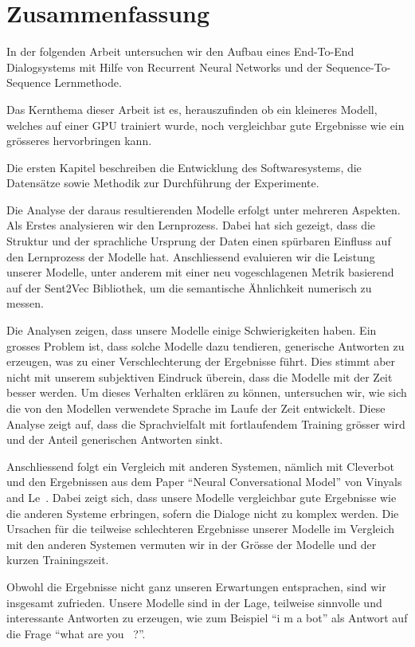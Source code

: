 \chapter*{Zusammenfassung}
In der folgenden Arbeit untersuchen wir den Aufbau eines End-To-End Dialogsystems mit Hilfe von Recurrent Neural Networks und der Sequence-To-Sequence Lernmethode.

Das Kernthema dieser Arbeit ist es, herauszufinden ob ein kleineres Modell, welches auf einer GPU trainiert wurde, noch vergleichbar gute Ergebnisse wie ein grösseres hervorbringen kann.

Die ersten Kapitel beschreiben die Entwicklung des Softwaresystems, die Datensätze sowie Methodik zur Durchführung der Experimente.

Die Analyse der daraus resultierenden Modelle erfolgt unter mehreren Aspekten. Als Erstes analysieren wir den Lernprozess. Dabei hat sich gezeigt, dass die Struktur und der sprachliche Ursprung der Daten einen spürbaren Einfluss auf den Lernprozess der Modelle hat. Anschliessend evaluieren wir die Leistung unserer Modelle, unter anderem mit einer neu vogeschlagenen Metrik basierend auf der Sent2Vec Bibliothek, um die semantische Ähnlichkeit numerisch zu messen.

Die Analysen zeigen, dass unsere Modelle einige Schwierigkeiten haben. Ein grosses Problem ist, dass solche Modelle dazu tendieren, generische Antworten zu erzeugen, was zu einer Verschlechterung der Ergebnisse führt. Dies stimmt aber nicht mit unserem subjektiven Eindruck überein, dass die Modelle mit der Zeit besser werden. Um dieses Verhalten erklären zu können, untersuchen wir, wie sich die von den Modellen verwendete Sprache im Laufe der Zeit entwickelt. Diese Analyse zeigt auf, dass die Sprachvielfalt mit fortlaufendem Training grösser wird und der Anteil generischen Antworten sinkt.

Anschliessend folgt ein Vergleich mit anderen Systemen, nämlich mit Cleverbot und den Ergebnissen aus dem Paper ``Neural Conversational Model'' von Vinyals and Le~\cite{Vinyals:2015}. Dabei zeigt sich, dass unsere Modelle vergleichbar gute Ergebnisse wie die anderen Systeme erbringen, sofern die Dialoge nicht zu komplex werden. Die Ursachen für die teilweise schlechteren Ergebnisse unserer Modelle im Vergleich mit den anderen Systemen vermuten wir in der Grösse der Modelle und der kurzen Trainingszeit.

Obwohl die Ergebnisse nicht ganz unseren Erwartungen entsprachen, sind wir insgesamt zufrieden. Unsere Modelle sind in der Lage, teilweise sinnvolle und interessante Antworten zu erzeugen, wie zum Beispiel ``i m a bot'' als Antwort auf die Frage ``what are you~ ?''.